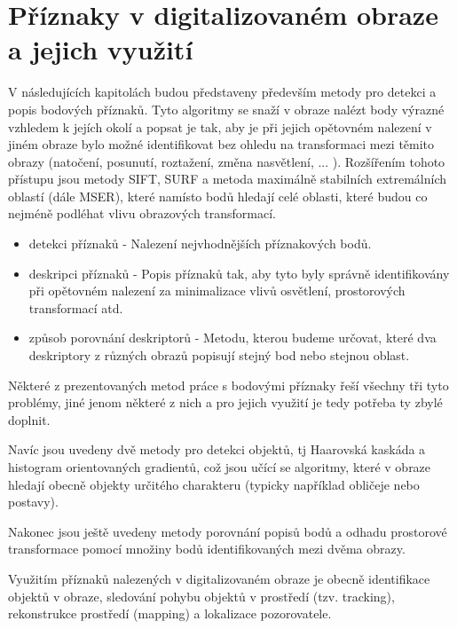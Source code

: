 
\chapter{Příznaky v digitalizovaném obraze a jejich využití}

V následujících kapitolách budou představeny především metody pro detekci a popis bodových příznaků. Tyto algoritmy se snaží v obraze nalézt body výrazné vzhledem k jejích okolí a popsat je tak, aby je při jejich opětovném nalezení v jiném obraze bylo možné identifikovat bez ohledu na transformaci mezi těmito obrazy (natočení, posunutí, roztažení, změna nasvětlení, ... ). Rozšířením tohoto přístupu jsou metody SIFT, SURF a metoda maximálně stabilních extremálních oblastí (dále MSER), které namísto bodů hledají celé oblasti, které budou co nejméně podléhat vlivu obrazových transformací.


\begin{itemize}
	\item{detekci příznaků} - Nalezení nejvhodnějších příznakových bodů.
	\item{deskripci příznaků} - Popis příznaků tak, aby tyto byly správně identifikovány při opětovném nalezení za minimalizace vlivů osvětlení, prostorových transformací atd.
	\item{způsob porovnání deskriptorů} - Metodu, kterou budeme určovat, které dva deskriptory z různých obrazů popisují stejný bod nebo stejnou oblast.
\end{itemize} 

Některé z prezentovaných metod práce s bodovými příznaky řeší všechny tři tyto problémy, jiné jenom některé z nich a pro jejich využití je tedy potřeba ty zbylé doplnit.

Navíc jsou uvedeny dvě metody pro detekci objektů, tj Haarovská kaskáda a histogram orientovaných gradientů, což jsou učící se algoritmy, které v obraze hledají obecně objekty určitého charakteru (typicky například obličeje nebo postavy).

Nakonec jsou ještě uvedeny metody porovnání popisů bodů a odhadu prostorové transformace pomocí množiny bodů identifikovaných mezi dvěma obrazy.

Využitím příznaků nalezených v digitalizovaném obraze je obecně identifikace objektů v obraze, sledování pohybu objektů v prostředí (tzv. tracking), rekonstrukce prostředí (mapping) a lokalizace pozorovatele.


